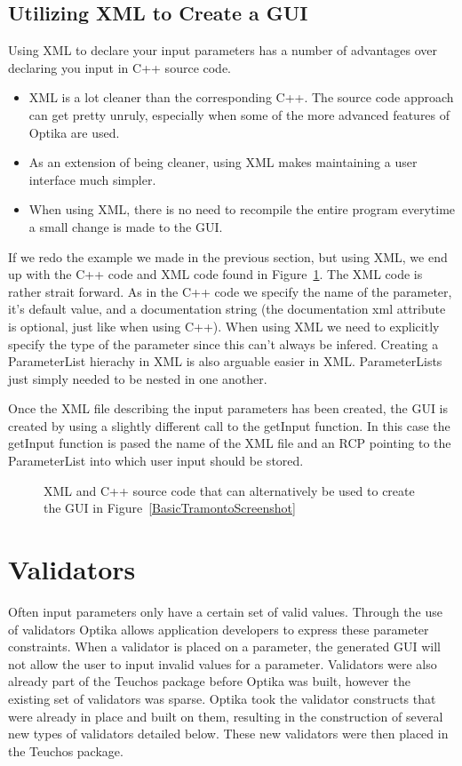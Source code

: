 \subsection{Utilizing XML to Create a GUI}
Using XML to declare your input parameters has a number of advantages over declaring you input in C++ source code.
\begin{itemize}
  \item XML is a lot cleaner than the corresponding C++. The source code approach can get pretty unruly, especially
  when some of the more advanced features of Optika are used.
  \item As an extension of being cleaner, using XML makes maintaining a user interface much simpler.
  \item When using XML, there is no need to recompile the entire program everytime a small change is made to the GUI.
\end{itemize}
If we redo the example we made in the previous section, but using XML, we end up with the C++ code and XML code found in
Figure~\ref{basicTramontoXML}. The XML code is rather strait forward. As in the C++ code we specify the name of the
parameter, it's default value, and a documentation string (the documentation xml attribute is optional, just like when using 
C++). When using XML we need to explicitly specify the type
of the parameter since this can't always be infered. Creating a ParameterList hierachy in XML is also arguable easier
in XML. ParameterLists just simply needed to be nested in one another.

Once the XML file describing the input parameters has been created, the GUI is created by using a slightly different
call to the getInput function. In this case the getInput function is pased the name of the XML file and an RCP pointing
to the ParameterList into which user input should be stored.
	\begin{figure}
		\subfigure[C++ Code]{
    
		\label{basicXMLC++}
		}
		\caption{XML and C++ source code that can alternatively be used to create the GUI in Figure~\ref{BasicTramontoScreenshot}}
		\label{basicTramontoXML}
	\end{figure}

\section{Validators}
Often input parameters only have a certain set of valid values. Through the use of validators Optika allows application
developers to express these parameter constraints. When a validator is placed on a parameter, the generated GUI will
not allow the user to input invalid values for a parameter. Validators were also already part of the Teuchos package
before Optika was built, however the existing set of validators was sparse. Optika took the validator constructs that
were already in place and built on them, resulting in the construction of several new types of validators detailed below.
These new validators were then placed in the Teuchos package.

